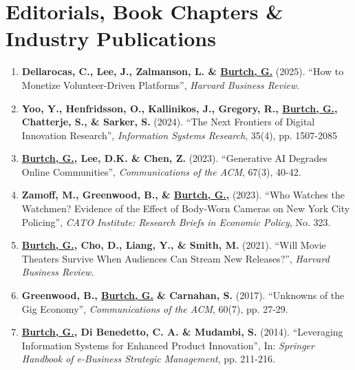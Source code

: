 \documentclass[10.5pt,letterpaper,sans]{moderncv}        %
\begin{document}
\vspace{4 pt}

\section{Editorials, Book Chapters \& Industry Publications}

\smallskip

\begin{enumerate}[leftmargin=!,labelindent=5pt,itemindent=-15pt]

\item \textbf{Dellarocas, C., Lee, J., Zalmanson, L. \& \underline{Burtch, G.}} (2025). ``How to Monetize Volunteer-Driven Platforms'', \textit{Harvard Business Review}.

\item \textbf{Yoo, Y., Henfridsson, O., Kallinikos, J., Gregory, R., \underline{Burtch, G.}, Chatterje, S., \& Sarker, S.} (2024). ``The Next Frontiers of Digital Innovation Research'', \textit{Information Systems Research}, 35(4), pp. 1507-2085

\item \textbf{\underline{Burtch, G.}, Lee, D.K. \& Chen, Z.} (2023). ``Generative AI Degrades Online Communities'', \textit{Communications of the ACM}, 67(3), 40-42.

\item \textbf{Zamoff, M., Greenwood, B., \& \underline{Burtch, G.}, } (2023). ``Who Watches the Watchmen? Evidence of the Effect of Body-Worn Cameras on New York City Policing'', \textit{CATO Institute: Research Briefs in Economic Policy}, No. 323.

\item \textbf{\underline{Burtch, G.}, Cho, D., Liang, Y., \& Smith, M.} (2021). ``Will Movie Theaters Survive When Audiences Can Stream New Releases?'', \textit{Harvard Business Review}.

\item \textbf{Greenwood, B., \underline{Burtch, G.} \& Carnahan, S.} (2017). ``Unknowns of the Gig Economy'', \textit{Communications of the ACM}, 60(7), pp. 27-29.

\item \textbf{\underline{Burtch, G.}, Di Benedetto, C. A. \& Mudambi, S.} (2014). ``Leveraging Information Systems for Enhanced Product Innovation'', In: \textit{Springer Handbook of e-Business Strategic Management}, pp. 211-216.

\end{enumerate}
\end{document}

